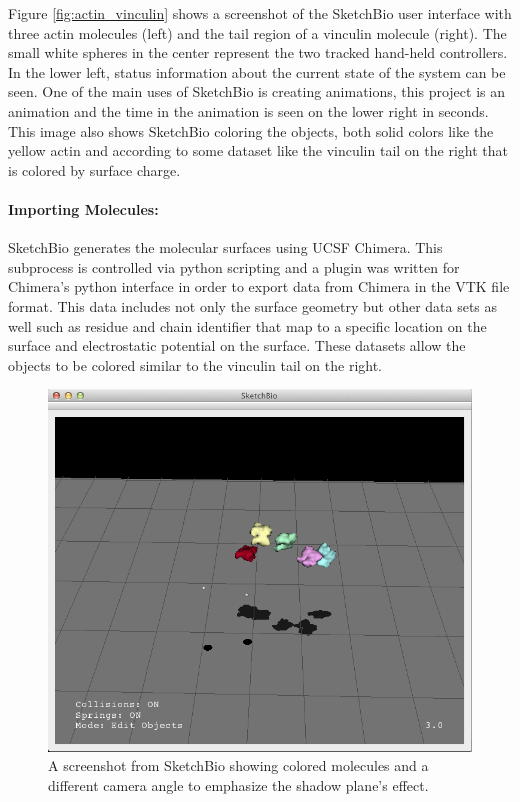 \documentclass[twocolumn]{bmcart}%
\begin{document}
Figure \ref{fig:actin_vinculin} shows a screenshot of the SketchBio user interface with three actin molecules (left) and the tail region of a vinculin molecule (right).  The small white spheres in the center represent the two tracked hand-held controllers.  In the lower left, status information about the current state of the system can be seen.  One of the main uses of SketchBio is creating animations, this project is an animation and the time in the animation is seen on the lower right in seconds.  This image also shows SketchBio coloring the objects, both solid colors like the yellow actin and according to some dataset like the vinculin tail on the right that is colored by surface charge.

\paragraph*{Importing Molecules:}
SketchBio generates the molecular surfaces using UCSF Chimera.  This subprocess is controlled via python scripting and a plugin was written for Chimera's python interface in order to export data from Chimera in the VTK file format.  This data includes not only the surface geometry but other data sets as well such as residue and chain identifier that map to a specific location on the surface and electrostatic potential on the surface.  These datasets allow the objects to be colored similar to the vinculin tail on the right.

\begin{figure}[h]
\centering
\includegraphics[width=0.8\columnwidth]{shadow_plane.png}
\caption{A screenshot from SketchBio showing colored molecules and a different camera angle to emphasize the shadow plane's effect.}
\label{fig:shadow_plane}
\end{figure}
\end{document}

